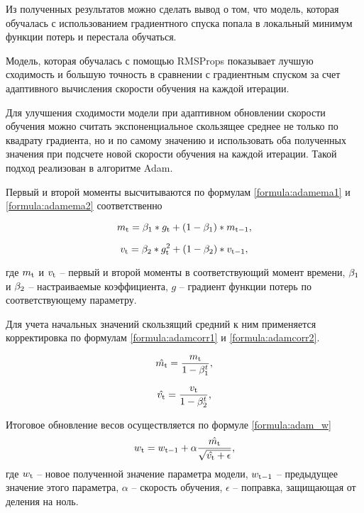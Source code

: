 Из полученных результатов можно сделать вывод о том, что модель, которая обучалась с использованием градиентного спуска попала в локальный минимум функции потерь и перестала обучаться. 

Модель, которая обучалась с помощью RMSProps показывает лучшую сходимость и большую точность в сравнении с градиентным спуском за счет адаптивного вычисления скорости обучения на каждой итерации.

Для улучшения сходимости модели при адаптивном обновлении скорости обучения можно считать экспоненциальное скользящее среднее не только по квадрату градиента, но и по самому значению и использовать оба полученных значения при подсчете новой скорости обучения на каждой итерации. Такой подход реализован в алгоритме Adam.

Первый и второй моменты высчитываются по формулам \ref{formula:adamema1} и \ref{formula:adamema2} соответственно

\begin{equation}\label{formula:adamema1}
m_{\rm{t}} = \beta_{\rm{1}} * g_{\rm{t}} + (1 - \beta_{\rm{1}}) * m_{\rm{t-1}},
\end{equation}

\begin{equation}\label{formula:adamema2}
v_{\rm{t}} = \beta_{\rm{2}} * g_{\rm{t}}^2 + (1 - \beta_{\rm{2}}) * v_{\rm{t-1}},
\end{equation}

где $m_{\rm{t}}$ и $v_{\rm{t}}$ -- первый и второй моменты в соответствующий момент времени, $\beta_{\rm{1}}$ и $\beta_{\rm{2}}$ -- настраиваемые коэффициента, $g$ -- градиент функции потерь по соответствующему параметру.

Для учета начальных значений скользящий средний к ним применяется корректировка по формулам \ref{formula:adamcorr1} и \ref{formula:adamcorr2}.

\begin{equation}\label{formula:adamcorr1}
\hat{m_{\rm{t}}} = \frac{m_{\rm{t}}}{1 - \beta_{\rm{1}}^t},
\end{equation}

\begin{equation}\label{formula:adamcorr2}
\hat{v_{\rm{t}}} = \frac{v_{\rm{t}}}{1 - \beta_{\rm{2}}^t},
\end{equation}

Итоговое обновление весов осуществляется по формуле 
\ref{formula:adam_w}
\begin{equation}\label{formula:adam_w}
w_{\rm{t}} = w_{\rm{t-1}} + \alpha\frac{\hat{m_{\rm{t}}}}{\sqrt{\hat{v_{\rm{t}}} + \epsilon}},
\end{equation}
где $w_{\rm{t}}$ -- новое полученной значение параметра модели, $w_{\rm{t-1}}$ -- предыдущее значение этого параметра, $\alpha$ -- скорость обучения, $\epsilon$ -- поправка, защищающая от деления на ноль.

